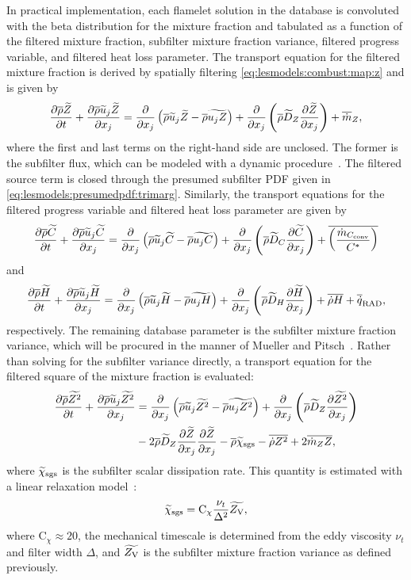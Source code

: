 In practical implementation, each flamelet solution in the database is convoluted with the beta distribution for the mixture fraction and tabulated as a function of the filtered mixture fraction, subfilter mixture fraction variance, filtered progress variable, and filtered heat loss parameter. The transport equation for the filtered mixture fraction is derived by spatially filtering \cref{eq:lesmodels:combust:map:z} and is given by
\begin{equation}\label{eq:lesmodels:presumedpdf:filteredz}
  \ftrder{\tf{Z}} = \dsff[\tf{Z}]{\tf{u_j Z}} + \fdt[Z]{\tf{Z}} + \fst[m]{Z},
\end{equation}
where the first and last terms on the right-hand side are unclosed. The former is the subfilter flux, which can be modeled with a dynamic procedure~\cite{germano1991,lilly1992,moin1991}. The filtered source term is closed through the presumed subfilter PDF given in \cref{eq:lesmodels:presumedpdf:trimarg}. Similarly, the transport equations for the filtered progress variable and filtered heat loss parameter are given by
\begin{equation}\label{eq:lesmodels:presumedpdf:filteredc}
  \ftrder{\tf{C}} = \dsff[\tf{C}]{\tf{u_j C}} + \fdt[C]{\tf{C}} + \mean{\left( \frac{\dot{m}_{C_{\text{conv}}}}{C^*} \right)}
\end{equation}
and
\begin{equation}\label{eq:lesmodels:presumedpdf:filteredh}
  \ftrder{\tf{H}} = \dsff[\tf{H}]{\tf{u_j H}} + \fdt[H]{\tf{H}} + \mean{\dot{\rho}H} + \fst[q]{\text{RAD}},
\end{equation}
respectively. The remaining database parameter is the subfilter mixture fraction variance, which will be procured in the manner of Mueller and Pitsch~\cite{mueller2012}. Rather than solving for the subfilter variance directly, a transport equation for the filtered square of the mixture fraction is evaluated:
\begin{equation}\label{eq:lesmodels:presumedpdf:filteredzsq}
  \begin{split}
    \ftrder{\tf{Z^2}} &= \dsff[\tf{Z^2}]{\tf{u_j Z^2}} + \fdt[Z]{\tf{Z^2}} \\
    &- 2\mean{\rho}\tf{D}_Z \pder[\tf{Z}]{x_j}\pder[\tf{Z}]{x_j} - \mean{\rho}\tf{\chi}_{\text{sgs}} - \mean{\dot{\rho}Z^2} + 2\mean{\dot{m}_Z Z},
  \end{split}
\end{equation}
where $\tf{\chi}_{\text{sgs}}$ is the subfilter scalar dissipation rate. This quantity is estimated with a linear relaxation model~\cite{ihme200890}:
\begin{equation}\label{eq:lesmodels:presumedpdf:chisgs}
  \tf{\chi}_{\text{sgs}} = \text{C}_{\chi}\frac{\nu_t}{\Delta^2}\tf{Z_{\text{V}}},
\end{equation}
where $\text{C}_{\chi} \approx 20$, the mechanical timescale is determined from the eddy viscosity $\nu_t$ and filter width $\Delta$, and $\tf{Z_{\text{V}}}$ is the subfilter mixture fraction variance as defined previously.

